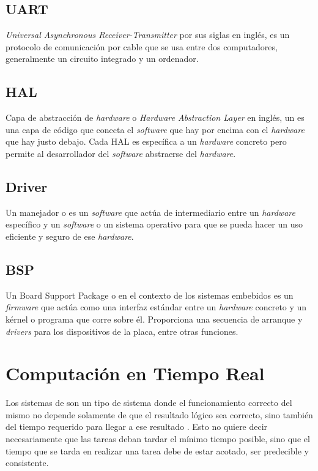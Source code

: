 \subsection{UART}
\emph{Universal Asynchronous Receiver-Transmitter} por sus siglas en inglés,  es un protocolo de comunicación por cable que se usa entre dos computadores, generalmente un circuito integrado y un ordenador. \cite{UART_BIB}

\subsection{HAL}
Capa de abstracción de \emph{hardware} o \emph{Hardware Abstraction Layer} en inglés, un  es una capa de código que conecta el \emph{software} que hay por encima con el \emph{hardware} que hay justo debajo. Cada HAL es específica a un \emph{hardware} concreto pero permite al desarrollador del \emph{software} abstraerse del \emph{hardware}. \cite{Yoo2003}

\subsection{Driver}
Un manejador o  es un \emph{software} que actúa de intermediario entre un \emph{hardware} específico y un \emph{software} o un sistema operativo para que se pueda hacer un uso eficiente y seguro de ese \emph{hardware}.

\subsection{BSP}
Un Board Support Package o  en el contexto de los sistemas embebidos es un \emph{firmware} que actúa como una interfaz estándar entre un \emph{hardware} concreto y un kérnel o programa que corre sobre él. Proporciona una secuencia de arranque y \emph{drivers} para los dispositivos de la placa, entre otras funciones.\cite{fredericksfaq}\\

\section{Computación en Tiempo Real}
Los sistemas de  son un tipo de sistema donde el funcionamiento correcto del mismo no depende solamente de que el resultado lógico sea correcto, sino también del tiempo requerido para llegar a ese resultado \cite{stankovic}. Esto no quiere decir necesariamente que las tareas deban tardar el mínimo tiempo posible, sino que el tiempo que se tarda en realizar una tarea debe de estar acotado, ser predecible y consistente.

